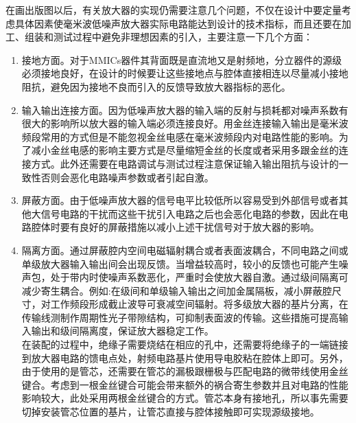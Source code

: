 在画出版图以后，有关放大器的实现仍需要注意几个问题，不仅在设计中要定量考虑具体因素使毫米波低噪声放大器实际电路能达到设计的技术指标，而且还要在加工、组装和测试过程中避免非理想因素的引入，主要注意一下几个方面：
\begin{enumerate}
	\item 接地方面。对于MMICs器件其背面既是直流地又是射频地，分立器件的源级必须接地良好，在设计的时候要让这些接地点与腔体直接相连以尽量减小接地阻抗，避免因为接地不良而引入的反馈导致放大器指标的恶化。
	\item 输入输出连接方面。因为低噪声放大器的输入端的反射与损耗都对噪声系数有很大的影响所以放大器的输入端必须连接良好。用金丝连接输入输出是毫米波频段常用的方式但是不能忽视金丝电感在毫米波频段内对电路性能的影响。为了减小金丝电感的影响主要方式是尽量缩短金丝的长度或者采用多跟金丝的连接方式。此外还需要在电路调试与测试过程注意保证输入输出阻抗与设计的一致性否则会恶化电路噪声参数或者引起自激。
	\item 屏蔽方面。由于低噪声放大器的信号电平比较低所以容易受到外部信号或者其他大信号电路的干扰而这些干扰引入电路之后也会恶化电路的参数，因此在电路腔体时要有良好的屏蔽措施以减小上述干扰信号对于放大器的影响。
	\item 隔离方面。通过屏蔽腔内空间电磁辐射耦合或者表面波耦合，不同电路之间或单级放大器输入输出间会出现反馈。当增益较高时，较小的反馈也可能产生噪声包，处于带内时使噪声系数恶化，严重时会使放大器自激。通过级间隔离可减少寄生耦合。例如:在级间和单级输入输出之间加金属隔板，减小屏蔽腔尺寸，对工作频段形成截止波导可衰减空间辐射。将多级放大器的基片分离，在传输线测制作周期性光子带隙结构，可抑制表面波的传输。这些措施可提高输入输出和级间隔离度，保证放大器稳定工作。\\
	在装配的过程中，绝缘子需要烧结在相应的孔中，还需要将绝缘子的一端链接到放大器电路的馈电点处，射频电路基片使用导电胶粘在腔体上即可。另外，由于使用的是管芯，还需要在管芯的漏极跟栅极与匹配电路的微带线使用金丝键合。考虑到一根金丝键合可能会带来额外的祸合寄生参数并且对电路的性能影响较大，此处采用两根金丝键合的方式。管芯本身有接地孔，所以事先需要切掉安装管芯位置的基片，让管芯直接与腔体接触即可实现源级接地。
\end{enumerate}



